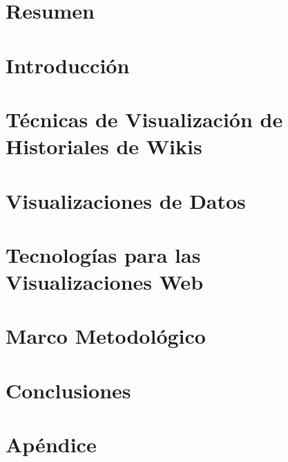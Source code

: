 \documentclass[12pt, twoside]{report}
\begin{document}


\chapter*{Resumen}


\tableofcontents

\listoffigures

\listoftables

\chapter*{Introducción}


\chapter{Técnicas de Visualización de Historiales de Wikis}


\chapter{Visualizaciones de Datos}


\chapter{Tecnologías para las Visualizaciones Web}


\chapter{Marco Metodológico}


\chapter*{Conclusiones}


\appendix
\chapter*{Apéndice}


\printbibliography
\end{document}

